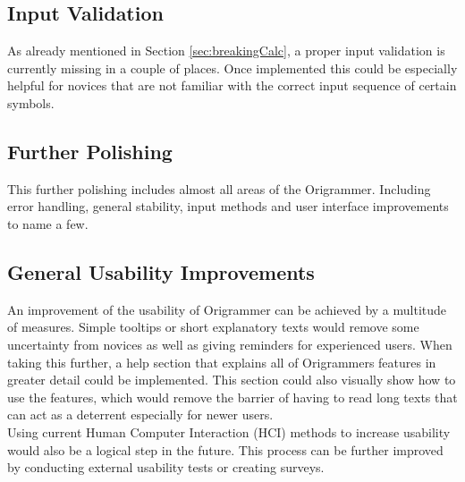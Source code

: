 \subsection{Input Validation}

As already mentioned in Section \ref{sec:breakingCalc}, a proper input validation is currently missing in a couple of places. Once implemented this could be especially helpful for novices that are not familiar with the correct input sequence of certain symbols.

\subsection{Further Polishing}

This further polishing includes almost all areas of the Origrammer. Including error handling, general stability, input methods and user interface improvements to name a few.

\subsection{General Usability Improvements}

An improvement of the usability of Origrammer can be achieved by a multitude of measures.
Simple tooltips or short explanatory texts would remove some uncertainty from novices as well as giving reminders for experienced users. When taking this further, a help section that explains all of Origrammers features in greater detail could be implemented. This section could also visually show how to use the features, which would remove the barrier of having to read long texts that can act as a deterrent especially for newer users.
\\
Using current Human Computer Interaction (HCI) methods to increase usability would also be a logical step in the future. This process can be further improved by conducting external usability tests or creating surveys.